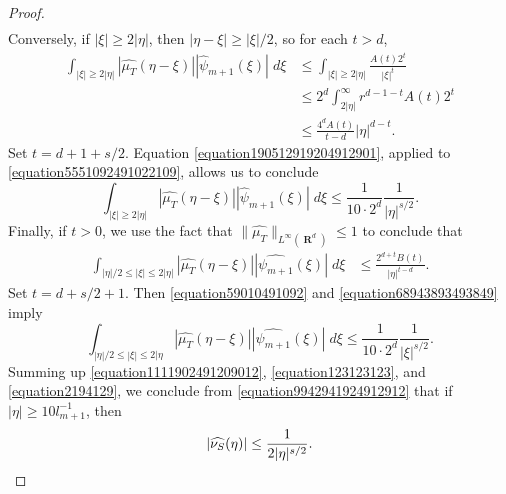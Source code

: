 \documentclass[12pt,reqno]{article}
\DeclareMathOperator{\RR}{\mathbf{R}}
\begin{document}
\begin{proof}
\begin{equation}
\begin{split}
    \end{split}
    \end{equation}
    Conversely, if $|\xi| \geq 2|\eta|$, then $|\eta - \xi| \geq |\xi|/2$, so for each $t > d$,
    \begin{equation} \label{equation5551092491022109}
    \begin{split}
        \int_{|\xi| \geq 2|\eta|} |\widehat{\mu_T}(\eta - \xi)| |\widehat{\psi}_{m+1}(\xi)|\; d\xi &\leq \int_{|\xi| \geq 2|\eta|} \frac{A(t) 2^t}{|\xi|^t}\\
        &\leq 2^d \int_{2|\eta|}^\infty r^{d-1 - t} A(t) 2^t\\
        &\leq \frac{4^d A(t)}{t - d} |\eta|^{d-t}.
    \end{split}
    \end{equation}
    Set $t = d + 1 + s/2$. Equation \eqref{equation190512919204912901}, applied to \eqref{equation5551092491022109}, allows us to conclude
    \begin{equation} \label{equation123123123}
        \int_{|\xi| \geq 2|\eta|} |\widehat{\mu_T}(\eta - \xi)| |\widehat{\psi}_{m+1}(\xi)|\; d\xi \leq \frac{1}{10 \cdot 2^d} \frac{1}{|\eta|^{s/2}}.
    \end{equation}
    Finally, if $t > 0$, we use the fact that $\| \widehat{\mu_T} \|_{L^\infty(\RR^d)} \leq 1$ to conclude that
    \begin{equation} \label{equation59010491092}
    \begin{split}
        \int_{|\eta|/2 \leq |\xi| \leq 2|\eta|} |\widehat{\mu_T}(\eta - \xi)| |\widehat{\psi_{m+1}}(\xi)|\; d\xi &\leq \frac{2^{d+t} B(t)}{|\eta|^{t-d}}.
    \end{split}
    \end{equation}
    Set $t = d + s/2 + 1$. Then \eqref{equation59010491092} and \eqref{equation68943893493849} imply
    \begin{equation} \label{equation2194129}
        \int_{|\eta|/2 \leq |\xi| \leq 2|\eta} |\widehat{\mu_T}(\eta - \xi)| |\widehat{\psi_{m+1}}(\xi)|\; d\xi \leq \frac{1}{10 \cdot 2^d} \frac{1}{|\xi|^{s/2}}.
    \end{equation}
    Summing up \eqref{equation1111902491209012}, \eqref{equation123123123}, and \eqref{equation2194129}, we conclude from \eqref{equation9942941924912912} that if $|\eta| \geq 10 l_{m+1}^{-1}$, then
    \begin{equation} \label{equation12904120941290419029012}
        |\widehat{\nu_S}(\eta)| \leq \frac{1}{2|\eta|^{s/2}}. \qedhere
    \end{equation}
\end{proof}
\end{document}
